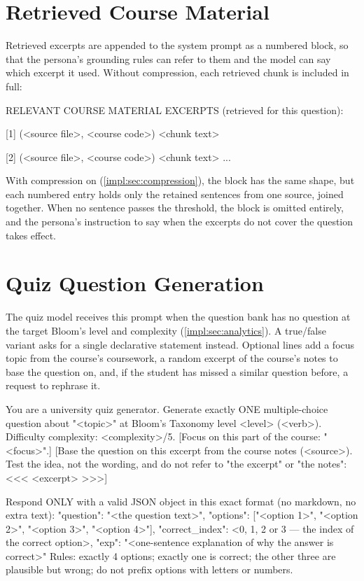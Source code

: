 \section{Retrieved Course Material}
\label{appsec:rag_prompt}

Retrieved excerpts are appended to the system prompt as a numbered block, so
that the persona's grounding rules can refer to them and the model can say
which excerpt it used. Without compression, each retrieved chunk is included
in full:

\begin{prompt}
RELEVANT COURSE MATERIAL EXCERPTS (retrieved for this question):

[1] (<source file>, <course code>)
<chunk text>

[2] (<source file>, <course code>)
<chunk text>
...
\end{prompt}

With compression on (\autoref{impl:sec:compression}), the block has the same
shape, but each numbered entry holds only the retained sentences from one
source, joined together. When no sentence passes the threshold, the block is
omitted entirely, and the persona's instruction to say when the excerpts do
not cover the question takes effect.

\section{Quiz Question Generation}
\label{appsec:quiz_prompt}

The quiz model receives this prompt when the question bank has no question at
the target Bloom's level and complexity (\autoref{impl:sec:analytics}). A
true/false variant asks for a single declarative statement instead. Optional
lines add a focus topic from the course's coursework, a random excerpt of the
course's notes to base the question on, and, if the student has missed a
similar question before, a request to rephrase it.

\begin{prompt}
You are a university quiz generator. Generate exactly ONE multiple-choice question about "<topic>" at Bloom's Taxonomy level <level> (<verb>).
Difficulty complexity: <complexity>/5.
[Focus on this part of the course: "<focus>".]
[Base the question on this excerpt from the course notes (<source>). Test the idea, not the wording, and do not refer to "the excerpt" or "the notes":
<<<
<excerpt>
>>>]

Respond ONLY with a valid JSON object in this exact format (no markdown, no extra text):
{
  "question": "<the question text>",
  "options": ["<option 1>", "<option 2>", "<option 3>", "<option 4>"],
  "correct_index": <0, 1, 2 or 3 — the index of the correct option>,
  "exp": "<one-sentence explanation of why the answer is correct>"
}
Rules: exactly 4 options; exactly one is correct; the other three are plausible but wrong; do not prefix options with letters or numbers.
\end{prompt}

